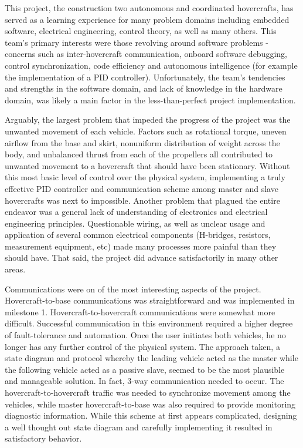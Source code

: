 This project, the construction two autonomous and coordinated hovercrafts, has served as a learning experience for many problem domains including embedded software, electrical engineering, control theory, as well as many others.  This team's primary interests were those revolving around software problems - concerns such as inter-hovercraft communication, onboard software debugging, control synchronization, code efficiency and autonomous intelligence (for example the implementation of a PID controller).  Unfortunately, the team's tendencies and strengths in the software domain, and lack of knowledge in the hardware domain, was likely a main factor in the less-than-perfect project implementation.  

Arguably, the largest problem that impeded the progress of the project was the unwanted movement of each vehicle.  Factors such as rotational torque, uneven airflow from the base and skirt, nonuniform distribution of weight across the body, and unbalanced thrust from each of the propellers all contributed to unwanted movement to a hovercraft that should have been stationary.  Without this most basic level of control over the physical system, implementing a truly effective PID controller and communication scheme among master and slave hovercrafts was next to impossible.  Another problem that plagued the entire endeavor was a general lack of understanding of electronics and electrical engineering principles.  Questionable wiring, as well as unclear usage and application of several common electrical components (H-bridges, resistors, measurement equipment, etc) made many processes more painful than they should have.  That said, the project did advance satisfactorily in many other areas.  

Communications were on of the most interesting aspects of the project.  Hovercraft-to-base communications was straightforward and was implemented in milestone 1.  Hovercraft-to-hovercraft communications were somewhat more difficult.  Successful communication in this environment required a higher degree of fault-tolerance and automation. Once the user initiates both vehicles, he no longer has any further control of the physical system.  The approach taken, a state diagram and protocol whereby the leading vehicle acted as the master while the following vehicle acted as a passive slave, seemed to be the most plausible and manageable solution.  In fact, 3-way communication needed to occur.  The hovercraft-to-hovercraft traffic was needed to synchronize movement among the vehicles, while master hovercraft-to-base was also required to provide monitoring diagnostic information.  While this scheme at first appears complicated, designing a well thought out state diagram and carefully implementing it resulted in satisfactory behavior.  

